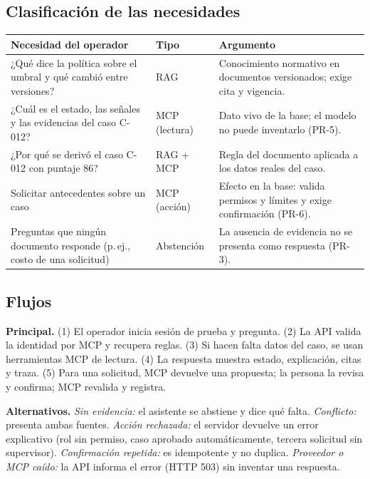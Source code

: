 \documentclass[11pt,a4paper]{article}
\newcommand{\cab}{\rowcolor{azulmira!14}}
\newcommand{\tabla}{\small\rowcolors{2}{white}{grisclaro}}
\begin{document}
\subsection{Clasificación de las necesidades}
\begin{center}\tabla
\begin{tabularx}{\textwidth}{@{}>{\raggedright\arraybackslash}p{4.1cm}p{2.5cm}Y@{}}
\toprule
\cab\textbf{Necesidad del operador} & \textbf{Tipo} & \textbf{Argumento}\\
\midrule
¿Qué dice la política sobre el umbral y qué cambió entre versiones? & RAG & Conocimiento normativo en documentos versionados; exige cita y vigencia.\\
¿Cuál es el estado, las señales y las evidencias del caso C-012? & MCP (lectura) & Dato vivo de la base; el modelo no puede inventarlo (PR-5).\\
¿Por qué se derivó el caso C-012 con puntaje 86? & RAG + MCP & Regla del documento aplicada a los datos reales del caso.\\
Solicitar antecedentes sobre un caso & MCP (acción) & Efecto en la base: valida permisos y límites y exige confirmación (PR-6).\\
Preguntas que ningún documento responde (p.\,ej., costo de una solicitud) & Abstención & La ausencia de evidencia no se presenta como respuesta (PR-3).\\
\bottomrule
\end{tabularx}
\end{center}

\subsection{Flujos}
\textbf{Principal.} (1) El operador inicia sesión de prueba y pregunta. (2) La API valida la identidad por MCP y recupera reglas. (3) Si hacen falta datos del caso, se usan herramientas MCP de lectura. (4) La respuesta muestra estado, explicación, citas y traza. (5) Para una solicitud, MCP devuelve una propuesta; la persona la revisa y confirma; MCP revalida y registra.

\textbf{Alternativos.} \emph{Sin evidencia:} el asistente se abstiene y dice qué falta. \emph{Conflicto:} presenta ambas fuentes. \emph{Acción rechazada:} el servidor devuelve un error explicativo (rol sin permiso, caso aprobado automáticamente, tercera solicitud sin supervisor). \emph{Confirmación repetida:} es idempotente y no duplica. \emph{Proveedor o MCP caído:} la API informa el error (HTTP 503) sin inventar una respuesta.
\end{document}
